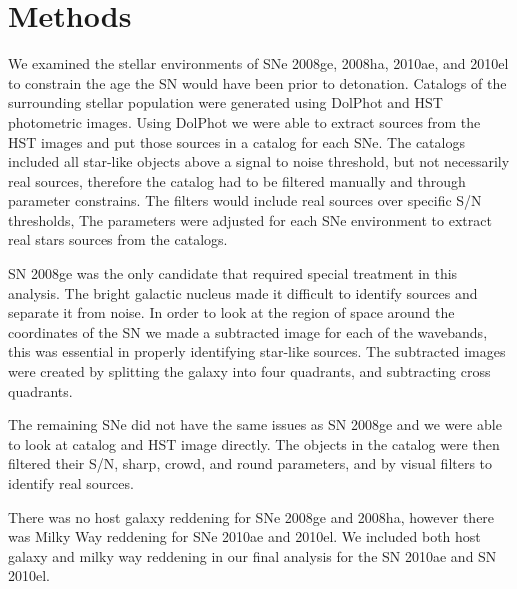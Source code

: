 \documentclass[preprint]{aastex}
\begin{document}

\section{Methods}
We examined the stellar environments of SNe 
 2008ge, 2008ha, 2010ae, and 2010el 
to constrain the age the SN would have been prior to detonation. 
Catalogs of the surrounding stellar population 
were generated using DolPhot and HST photometric images. 
Using DolPhot we were able to extract sources from the HST images 
and put those sources in a catalog for each SNe. 
The catalogs included all star-like objects above
a signal to noise threshold, but not necessarily real sources, therefore the catalog had to be
filtered manually and through parameter constrains. 
The filters would include real sources over specific S/N thresholds, 
The parameters were adjusted for each SNe environment to extract real stars sources from the catalogs.

SN 2008ge was the only candidate that required special treatment in this analysis. 
The bright galactic nucleus made it difficult to identify sources and separate it from noise. 
In order to look at the region of space around the coordinates of the SN
we made a subtracted image for each of the wavebands, this was essential in
properly identifying star-like sources. 
The subtracted images were created by splitting the galaxy into four quadrants, and subtracting 
cross quadrants. 

The remaining SNe did not have the same issues as SN 2008ge and we were able to look at catalog
 and HST image directly. The objects in the catalog were then filtered their 
S/N, sharp, crowd, and round parameters, and by visual filters to identify real sources.

There was no host galaxy reddening for SNe 2008ge and 2008ha, however there was Milky Way reddening 
for SNe 2010ae and 2010el. We included both host galaxy and milky way reddening in our final analysis 
for the SN 2010ae and SN 2010el. 

\end{document}

